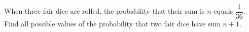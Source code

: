 When three fair dice are rolled, the probability that their sum is $n$ equals $\dfrac1{36}$. Find all possible values of the probability that two fair dice have sum $n+1$.
